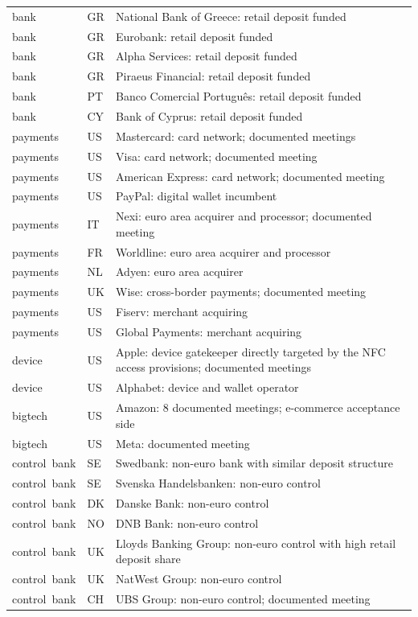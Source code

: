 \begin{longtable}{llp{7.2cm}}
bank & GR & National Bank of Greece: retail deposit funded \\
bank & GR & Eurobank: retail deposit funded \\
bank & GR & Alpha Services: retail deposit funded \\
bank & GR & Piraeus Financial: retail deposit funded \\
bank & PT & Banco Comercial Portugu\^es: retail deposit funded \\
bank & CY & Bank of Cyprus: retail deposit funded \\
payments & US & Mastercard: card network; documented meetings \\
payments & US & Visa: card network; documented meeting \\
payments & US & American Express: card network; documented meeting \\
payments & US & PayPal: digital wallet incumbent \\
payments & IT & Nexi: euro area acquirer and processor; documented meeting \\
payments & FR & Worldline: euro area acquirer and processor \\
payments & NL & Adyen: euro area acquirer \\
payments & UK & Wise: cross-border payments; documented meeting \\
payments & US & Fiserv: merchant acquiring \\
payments & US & Global Payments: merchant acquiring \\
device & US & Apple: device gatekeeper directly targeted by the NFC access provisions; documented meetings \\
device & US & Alphabet: device and wallet operator \\
bigtech & US & Amazon: 8 documented meetings; e-commerce acceptance side \\
bigtech & US & Meta: documented meeting \\
control\ bank & SE & Swedbank: non-euro bank with similar deposit structure \\
control\ bank & SE & Svenska Handelsbanken: non-euro control \\
control\ bank & DK & Danske Bank: non-euro control \\
control\ bank & NO & DNB Bank: non-euro control \\
control\ bank & UK & Lloyds Banking Group: non-euro control with high retail deposit share \\
control\ bank & UK & NatWest Group: non-euro control \\
control\ bank & CH & UBS Group: non-euro control; documented meeting \\
\bottomrule
\end{longtable}
